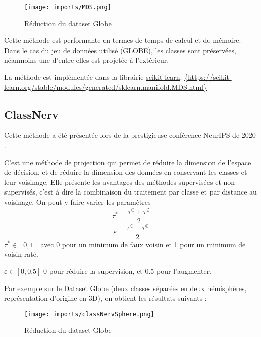 \begin{center}
    \begin{figure}[ht!]
        \centering
        
        \texttt{[image: imports/MDS.png]}
        
        \caption{Réduction du dataset Globe}
    \end{figure}
\end{center}

Cette méthode est performante en termes de temps de calcul et de mémoire. Dans le cas du jeu de données utilisé (GLOBE), les classes sont préservées, néanmoins une d'entre elles est projetée à l'extérieur.

La méthode est implémentée dans la librairie \href{https://scikit-learn.org/stable/modules/generated/sklearn.manifold.MDS.html}{scikit-learn}.
\url{{https://scikit-learn.org/stable/modules/generated/sklearn.manifold.MDS.html}}


\subsection{ClassNerv}
 Cette méthode a été présentée lors de la prestigieuse conférence NeurIPS de 2020 \cite{colange_steering_2020}.

 C'est une méthode de projection qui permet de réduire la dimension de l'espace de décision, et de réduire la dimension des données en conservant les classes et leur voisinage. 
 Elle présente les avantages des méthodes supervisées et non supervisés, c'est à dire la combinaison du traitement par classe et par distance au voisinage.
 On peut y faire varier les paramètres \[\tau^*=\dfrac{\tau^\in + \tau^{\not\in}}{2}\]  \[\varepsilon=\dfrac{\tau^\in - \tau^{\not\in}}{2}\]  
 $ \tau^* \in [0,1] $ avec 0 pour un minimum de faux voisin et 1 pour un minimum de voisin raté. 
 
 \noindent $\varepsilon \in [0,0.5]$ 0 pour réduire la supervision, et 0.5 pour l'augmenter. 
 
 \noindent
 Par exemple sur le Dataset Globe (deux classes séparées en deux hémisphères, représentation d'origine en 3D), on obtient les résultats suivants :


\begin{center}
    \begin{figure}[ht!]
        \centering
        
        \texttt{[image: imports/classNervSphere.png]}
        
        \caption{Réduction du dataset Globe}
    \end{figure}
\end{center}

